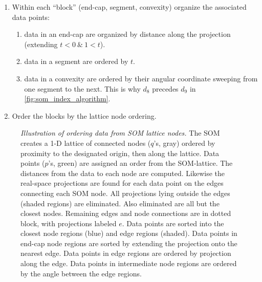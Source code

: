 \documentclass[fleqn,usenatbib]{mnras}
\begin{document}
\begin{enumerate}[label={(\bfseries \arabic*):}, leftmargin=*]
\begin{enumerate}[label={(\bfseries \arabic*):}, leftmargin=*]
          \end{enumerate}
        \item Within each ``block'' (end-cap, segment, convexity) organize the
        associated data points:
          \begin{enumerate}
              \item data in an end-cap are organized by distance along the
              projection (extending $t < 0 \ \& \ 1 < t$).
              \item data in a segment are ordered by $t$.
              \item data in a convexity are ordered by their angular coordinate
              sweeping from one segment to the next. This is why $d_8$ precedes
              $d_9$ in \autoref{fig:som_index_algorithm}.
          \end{enumerate}
        \item Order the blocks by the lattice node ordering.
      \end{enumerate}

      \begin{figure*}
        \centering
        \caption{
          \emph{Illustration of ordering data from SOM lattice nodes.}
          The SOM creates a 1-D lattice of connected nodes ($q$'s, gray) ordered
          by proximity to the designated origin, then along the lattice. Data
          points ($p$'s, green) are assigned an order from the SOM-lattice. The
          distances from the data to each node are computed. Likewise the
          real-space projections are found for each data point on the edges
          connecting each SOM node. All projections lying outside the edges
          (shaded regions) are eliminated. Also eliminated are all but the
          closest nodes. Remaining edges and node connections are in dotted
          block, with projections labeled $e$. Data points are sorted into the
          closest node regions (blue) and edge regions (shaded). Data points in
          end-cap node regions are sorted by extending the projection onto the
          nearest edge. Data points in edge regions are ordered by projection
          along the edge. Data points in intermediate node regions are ordered
          by the angle between the edge regions. }
        \label{fig:som_index_algorithm}
      \end{figure*}
\end{document}
